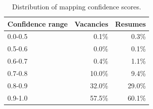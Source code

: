 \begin{table}[htbp]
  \centering
  \caption{Distribution of mapping confidence scores.}
  \label{tab:confidence}
  \begin{tabular}{lrr}
    \toprule
    Confidence range & Vacancies & Resumes \\
    \midrule
  0.0-0.5 & 0.1\% & 0.3\% \\
  0.5-0.6 & 0.0\% & 0.1\% \\
  0.6-0.7 & 0.4\% & 1.1\% \\
  0.7-0.8 & 10.0\% & 9.4\% \\
  0.8-0.9 & 32.0\% & 29.0\% \\
  0.9-1.0 & 57.5\% & 60.1\% \\
    \bottomrule
  \end{tabular}
\end{table}